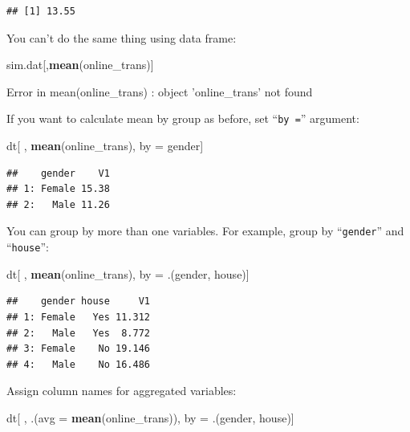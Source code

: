 \documentclass[12pt,]{krantz}
\newenvironment{Shaded}{\begin{snugshade}}{\end{snugshade}}
\newcommand{\KeywordTok}[1]{\textcolor[rgb]{0.13,0.29,0.53}{\textbf{{#1}}}}
\newcommand{\DataTypeTok}[1]{\textcolor[rgb]{0.13,0.29,0.53}{{#1}}}
\newcommand{\StringTok}[1]{\textcolor[rgb]{0.31,0.60,0.02}{{#1}}}
\newcommand{\NormalTok}[1]{{#1}}
\theoremstyle{definition}
\theoremstyle{definition}
\theoremstyle{remark}
\begin{document}
\begin{verbatim}
## [1] 13.55
\end{verbatim}

You can't do the same thing using data frame:

\begin{Shaded}
\begin{Highlighting}[]
\NormalTok{sim.dat[,}\KeywordTok{mean}\NormalTok{(online_trans)]}
\end{Highlighting}
\end{Shaded}

\begin{Shaded}
\begin{Highlighting}[]
\NormalTok{Error in mean(online_trans) : object 'online_trans' not found}
\end{Highlighting}
\end{Shaded}

If you want to calculate mean by group as before, set ``\texttt{by\ =}''
argument:

\begin{Shaded}
\begin{Highlighting}[]
\NormalTok{dt[ , }\KeywordTok{mean}\NormalTok{(online_trans), by =}\StringTok{ }\NormalTok{gender]}
\end{Highlighting}
\end{Shaded}

\begin{verbatim}
##    gender    V1
## 1: Female 15.38
## 2:   Male 11.26
\end{verbatim}

You can group by more than one variables. For example, group by
``\texttt{gender}'' and ``\texttt{house}'':

\begin{Shaded}
\begin{Highlighting}[]
\NormalTok{dt[ , }\KeywordTok{mean}\NormalTok{(online_trans), by =}\StringTok{ }\NormalTok{.(gender, house)]}
\end{Highlighting}
\end{Shaded}

\begin{verbatim}
##    gender house     V1
## 1: Female   Yes 11.312
## 2:   Male   Yes  8.772
## 3: Female    No 19.146
## 4:   Male    No 16.486
\end{verbatim}

Assign column names for aggregated variables:

\begin{Shaded}
\begin{Highlighting}[]
\NormalTok{dt[ , .(}\DataTypeTok{avg =} \KeywordTok{mean}\NormalTok{(online_trans)), by =}\StringTok{ }\NormalTok{.(gender, house)]}
\end{Highlighting}
\end{Shaded}
\end{document}
